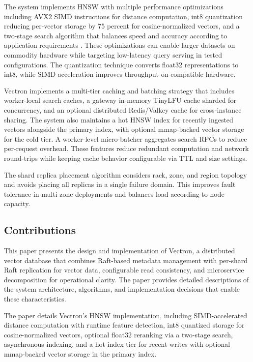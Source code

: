 \documentclass[conference]{IEEEtran}
\begin{document}
The system implements HNSW with multiple performance optimizations including AVX2 SIMD instructions for distance computation, int8 quantization reducing per-vector storage by 75 percent for cosine-normalized vectors, and a two-stage search algorithm that balances speed and accuracy according to application requirements \cite{hnsw,simd,pq}. These optimizations can enable larger datasets on commodity hardware while targeting low-latency query serving in tested configurations. The quantization technique converts float32 representations to int8, while SIMD acceleration improves throughput on compatible hardware.

Vectron implements a multi-tier caching and batching strategy that includes worker-local search caches, a gateway in-memory TinyLFU cache sharded for concurrency, and an optional distributed Redis/Valkey cache for cross-instance sharing. The system also maintains a hot HNSW index for recently ingested vectors alongside the primary index, with optional mmap-backed vector storage for the cold tier. A worker-level micro-batcher aggregates search RPCs to reduce per-request overhead. These features reduce redundant computation and network round-trips while keeping cache behavior configurable via TTL and size settings.

The shard replica placement algorithm considers rack, zone, and region topology and avoids placing all replicas in a single failure domain. This improves fault tolerance in multi-zone deployments and balances load according to node capacity.

\subsection{Contributions}

This paper presents the design and implementation of Vectron, a distributed vector database that combines Raft-based metadata management with per-shard Raft replication for vector data, configurable read consistency, and microservice decomposition for operational clarity. The paper provides detailed descriptions of the system architecture, algorithms, and implementation decisions that enable these characteristics.

The paper details Vectron's HNSW implementation, including SIMD-accelerated distance computation with runtime feature detection, int8 quantized storage for cosine-normalized vectors, optional float32 reranking via a two-stage search, asynchronous indexing, and a hot index tier for recent writes with optional mmap-backed vector storage in the primary index.
\end{document}
